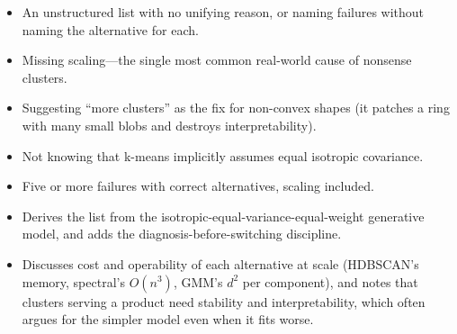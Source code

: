 \begin{interviewq}
\redflags
\begin{itemize}
    \item An unstructured list with no unifying reason, or naming failures without naming the alternative for each.
    \item Missing scaling---the single most common real-world cause of nonsense clusters.
    \item Suggesting ``more clusters'' as the fix for non-convex shapes (it patches a ring with many small blobs and destroys interpretability).
    \item Not knowing that k-means implicitly assumes equal isotropic covariance.
\end{itemize}


\goodgreat
\begin{itemize}
    \item {} Five or more failures with correct alternatives, scaling included.
    \item {} Derives the list from the isotropic-equal-variance-equal-weight generative model, and adds the diagnosis-before-switching discipline.
    \item {} Discusses cost and operability of each alternative at scale (HDBSCAN's memory, spectral's $O(n^3)$, GMM's $d^2$ per component), and notes that clusters serving a product need stability and interpretability, which often argues for the simpler model even when it fits worse.
\end{itemize}

\end{interviewq}

